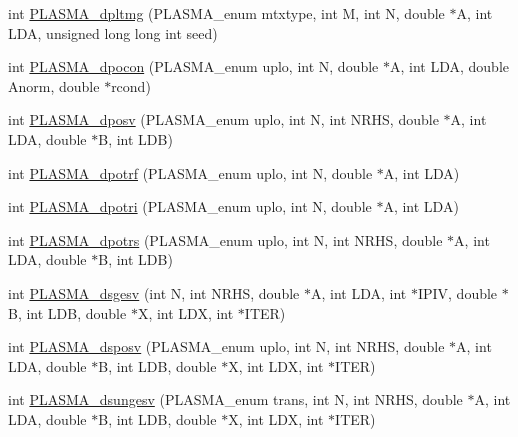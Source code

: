 \begin{DoxyCompactItemize}
\item 
int \hyperlink{group__double_ga6cde89e43a8752b706704ed7ec7d3917_ga6cde89e43a8752b706704ed7ec7d3917}{P\+L\+A\+S\+M\+A\+\_\+dpltmg} (P\+L\+A\+S\+M\+A\+\_\+enum mtxtype, int M, int N, double $\ast$A, int L\+D\+A, unsigned long long int seed)
\item 
int \hyperlink{group__double_ga2e52f461973867ecb409cfaa3d4cac36_ga2e52f461973867ecb409cfaa3d4cac36}{P\+L\+A\+S\+M\+A\+\_\+dpocon} (P\+L\+A\+S\+M\+A\+\_\+enum uplo, int N, double $\ast$A, int L\+D\+A, double Anorm, double $\ast$rcond)
\item 
int \hyperlink{group__double_ga83015e9476d13f0c9f056eac9b54804f_ga83015e9476d13f0c9f056eac9b54804f}{P\+L\+A\+S\+M\+A\+\_\+dposv} (P\+L\+A\+S\+M\+A\+\_\+enum uplo, int N, int N\+R\+H\+S, double $\ast$A, int L\+D\+A, double $\ast$B, int L\+D\+B)
\item 
int \hyperlink{group__double_ga08c3851e861086761123a375b8472df2_ga08c3851e861086761123a375b8472df2}{P\+L\+A\+S\+M\+A\+\_\+dpotrf} (P\+L\+A\+S\+M\+A\+\_\+enum uplo, int N, double $\ast$A, int L\+D\+A)
\item 
int \hyperlink{group__double_ga01b70786730b5e4c314b4584fe3697c5_ga01b70786730b5e4c314b4584fe3697c5}{P\+L\+A\+S\+M\+A\+\_\+dpotri} (P\+L\+A\+S\+M\+A\+\_\+enum uplo, int N, double $\ast$A, int L\+D\+A)
\item 
int \hyperlink{group__double_ga2d3c0509f11f1e9a9cf06b95109e62f5_ga2d3c0509f11f1e9a9cf06b95109e62f5}{P\+L\+A\+S\+M\+A\+\_\+dpotrs} (P\+L\+A\+S\+M\+A\+\_\+enum uplo, int N, int N\+R\+H\+S, double $\ast$A, int L\+D\+A, double $\ast$B, int L\+D\+B)
\item 
int \hyperlink{group__double_ga50fe4c984e8994fe22aac09c0f6c3422_ga50fe4c984e8994fe22aac09c0f6c3422}{P\+L\+A\+S\+M\+A\+\_\+dsgesv} (int N, int N\+R\+H\+S, double $\ast$A, int L\+D\+A, int $\ast$I\+P\+I\+V, double $\ast$B, int L\+D\+B, double $\ast$X, int L\+D\+X, int $\ast$I\+T\+E\+R)
\item 
int \hyperlink{group__double_gaf4c055accc54907abd1ea3a85555c9b4_gaf4c055accc54907abd1ea3a85555c9b4}{P\+L\+A\+S\+M\+A\+\_\+dsposv} (P\+L\+A\+S\+M\+A\+\_\+enum uplo, int N, int N\+R\+H\+S, double $\ast$A, int L\+D\+A, double $\ast$B, int L\+D\+B, double $\ast$X, int L\+D\+X, int $\ast$I\+T\+E\+R)
\item 
int \hyperlink{group__double_ga5ad1a5e52e906d9add120b37fc4301fc_ga5ad1a5e52e906d9add120b37fc4301fc}{P\+L\+A\+S\+M\+A\+\_\+dsungesv} (P\+L\+A\+S\+M\+A\+\_\+enum trans, int N, int N\+R\+H\+S, double $\ast$A, int L\+D\+A, double $\ast$B, int L\+D\+B, double $\ast$X, int L\+D\+X, int $\ast$I\+T\+E\+R)

\end{DoxyCompactItemize}
